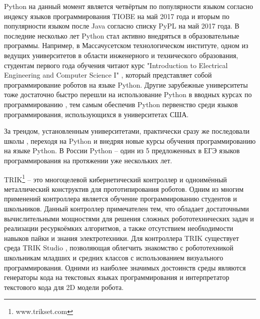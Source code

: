 \documentclass[14pt]{matmex-diploma-custom}
\begin{document}
Python на данный момент является четвёртым по популярности языком согласно индексу языков программирования TIOBE \cite{indextiobe} на май 2017 года и вторым по популярности языком после Java согласно списку PyPL \cite{indexpypl} на май 2017 года. В последние несколько лет Python стал активно внедряться в образовательные программы. Например, в Массачусетском технологическом институте, одном из ведущих \cite{QSUniRating2016, QSUniRating2017} университетов в области инженерного и технического образования, студентам первого года обучения читают курс "Introduction to Electrical Engineering and Computer Science I" \cite{stemMITCourse}, который представляет собой программирование роботов на языке Python. Другие зарубежные университеты тоже достаточно быстро перешли на использование Python в вводных курсах по программированию \cite{pythonUni}, тем самым обеспечив Python первенство среди языков программирования, использующихся в университетах США.

За трендом, установленным университетами, практически сразу же последовали школы \cite{stemSecCourse, stemSchool}, переходя на Python и внедряя новые курсы обучения программированию на языке Python. В России Python -- один из 5 предложенных в ЕГЭ языков программирования на протяжении уже нескольких лет.

TRIK\footnote{www.trikset.com} -- это многоцелевой кибернетический контроллер и одноимённый металлический конструктив для прототипирования роботов. Одним из многим применений контроллера является обучение программированию студентов и школьников. Данный контроллер примечателен тем, что обладает достаточными вычислительными мощностями для решения сложных робототехнических задач и реализации ресуркоёмких алгоритмов, а также отсутствием необходимости навыков пайки и знания электротехники. Для контроллера TRIK существует среда TRIK Studio \cite{qrealRobots, TRIKStudioTech}, позволяющая облегчить знакомство с робототехникой школьникам младших и средних классов с использованием визуального программирования. Одними из наиболее значимых достоинств среды являются генераторы кода на текстовых языках программирования и интерпретатор текстового кода для 2D модели робота. 
\end{document}
